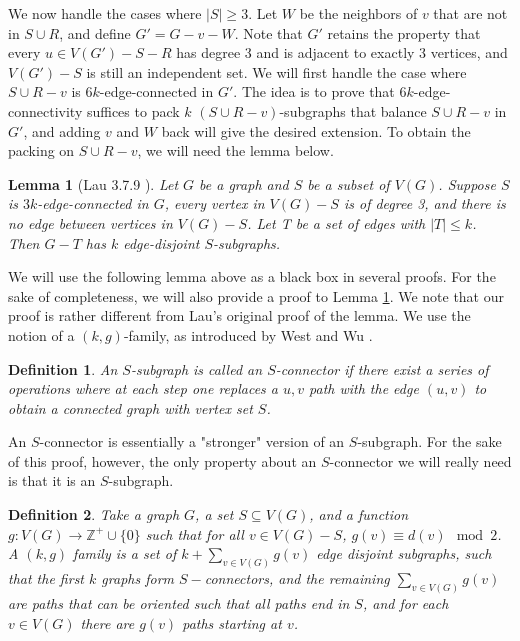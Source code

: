\documentclass{article}
\newtheorem{lemma}{Lemma}[section]
\newtheorem{definition}{Definition}[section]
\begin{document}
We now handle the cases where $|S| \geq 3$. Let $W$ be the neighbors of $v$ that are not in $S \cup R$, and define $G'=G-v-W$. Note that $G'$ retains the property that every $u \in V(G')-S-R$ has degree 3 and is adjacent to exactly 3 vertices, and $V(G')-S$ is still an independent set. We will first handle the case where $S \cup R-v$ is $6k$-edge-connected in $G'$. The idea is to prove that $6k$-edge-connectivity suffices to pack $k$ $(S \cup R-v)$-subgraphs that balance $S \cup R-v$ in $G'$, and adding $v$ and $W$ back will give the desired extension. To obtain the packing on $S \cup R -v$, we will need the lemma below. 

\begin{lemma}[Lau 3.7.9 \cite{lau-thesis}]\label{lem:treepacking}
    Let $G$ be a graph and $S$ be a subset of $V(G)$. Suppose $S$ is $3k$-edge-connected in $G$, every vertex in $V(G)-S$ is of degree 3, and there is no edge between vertices in $V(G)-S$. Let T be a set of edges with $|T| \leq k$. Then $G-T$ has $k$ edge-disjoint $S$-subgraphs.
\end{lemma}

We will use the following lemma above as a black box in several proofs. For the sake of completeness, we will also provide a proof to Lemma \ref{lem:treepacking}. We note that our proof is rather different from Lau's original proof of the lemma. We use the notion of a $(k,g)$-family, as introduced by West and Wu \cite{westwu}.

\begin{definition}
    An $S$-subgraph is called an $S$-connector if there exist a series of operations where at each step one replaces a $u,v$ path with the edge $(u,v)$ to obtain a connected graph with vertex set $S$.
\end{definition}

An $S$-connector is essentially a "stronger" version of an $S$-subgraph. For the sake of this proof, however, the only property about an $S$-connector we will really need is that it is an $S$-subgraph.

\begin{definition}
    Take a graph $G$, a set $S \subseteq V(G)$, and a function $g: V(G) \rightarrow \mathbb{Z}^+ \cup \{0 \}$ such that for all $v \in V(G)-S$, $g(v) \equiv d(v)\mod 2$. A $(k,g)$ family is a set of $k + \sum_{v \in V(G)}g(v)$ edge disjoint subgraphs, such that the first $k$ graphs form $S-$connectors, and the remaining $\sum_{v \in V(G)}g(v)$ are paths that can be oriented such that all paths end in $S$, and for each $v \in V(G)$ there are $g(v)$ paths starting at $v$. 
\end{definition}
\end{document}
